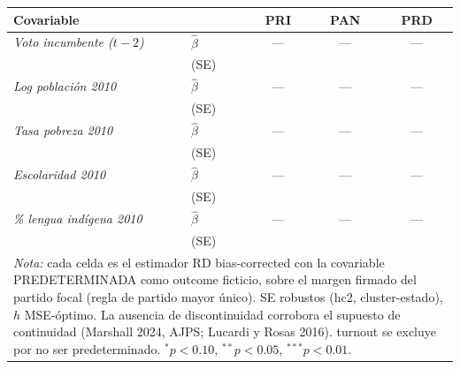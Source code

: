 \begin{tabular}{llccc}
\toprule
Covariable & & PRI & PAN & PRD \\
\midrule
\textit{Voto incumbente ($t-2$)} & $\hat{\beta}$ & --- & --- & --- \\
 & (SE) &  &  &  \\
\textit{Log población 2010} & $\hat{\beta}$ & --- & --- & --- \\
 & (SE) &  &  &  \\
\textit{Tasa pobreza 2010} & $\hat{\beta}$ & --- & --- & --- \\
 & (SE) &  &  &  \\
\textit{Escolaridad 2010} & $\hat{\beta}$ & --- & --- & --- \\
 & (SE) &  &  &  \\
\textit{\% lengua indígena 2010} & $\hat{\beta}$ & --- & --- & --- \\
 & (SE) &  &  &  \\
\bottomrule
\multicolumn{5}{p{0.9\textwidth}}{\footnotesize \textit{Nota:} cada celda es el
  estimador RD bias-corrected con la covariable PREDETERMINADA como outcome ficticio,
  sobre el margen firmado del partido focal (regla de partido mayor único). SE robustos
  (hc2, cluster-estado), $h$ MSE-óptimo. La ausencia de discontinuidad corrobora el
  supuesto de continuidad (Marshall 2024, AJPS; Lucardi y Rosas 2016). turnout se excluye
  por no ser predeterminado. $^{*}p<0.10$, $^{**}p<0.05$, $^{***}p<0.01$.}
\end{tabular}
